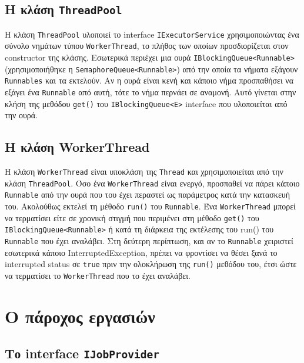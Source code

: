 \documentclass[a4paper,11pt]{article}
\begin{document}
\begin{sloppypar}
\subsection{Η κλάση \texttt{ThreadPool}}

Η κλάση \texttt{ThreadPool} υλοποιεί το interface \texttt{IExecutorService} χρησιμοποιώντας ένα σύνολο νημάτων τύπου \texttt{WorkerThread}, το πλήθος των οποίων προσδιορίζεται στον constructor της κλάσης. Εσωτερικά περιέχει μια ουρά \texttt{IBlockingQueue<Runnable>} (χρησιμοποιήθηκε η \texttt{SemaphoreQueue<Runnable>}) από την οποία τα νήματα εξάγουν \texttt{Runnables} και τα εκτελούν. Αν η ουρά είναι κενή και κάποιο νήμα προσπαθήσει να εξάγει ένα \texttt{Runnable} από αυτή, τότε το νήμα περνάει σε αναμονή. Αυτό γίνεται στην κλήση της μεθόδου \texttt{get()} του \texttt{IBlockingQueue<E>} interface που υλοποιείται από την ουρά.

\subsection{Η κλάση WorkerThread}

Η κλάση \texttt{WorkerThread} είναι υποκλάση της \texttt{Thread} και χρησιμοποιείται από την κλάση \texttt{ThreadPool}. Όσο ένα \texttt{WorkerThread} είναι ενεργό, προσπαθεί να πάρει κάποιο \texttt{Runnable} από την ουρά που του έχει περαστεί ως παράμετρος κατά την κατασκευή του. Ακολούθως εκτελεί τη μέθοδο \texttt{run()} του \texttt{Runnable}. Ένα \texttt{WorkerThread} μπορεί να τερματίσει είτε σε χρονική στιγμή που περιμένει στη μέθοδο \texttt{get()} του \texttt{IBlockingQueue<Runnable>} ή κατά τη διάρκεια της εκτέλεσης του run() του \texttt{Runnable} που έχει αναλάβει. Στη δεύτερη περίπτωση, και αν το \texttt{Runnable} χειριστεί εσωτερικά κάποιο InterruptedException, πρέπει να φροντίσει να θέσει ξανά το interrupted status σε \texttt{true} πριν την ολοκλήρωση της \texttt{run()} μεθόδου του, έτσι ώστε να τερματίσει το \texttt{WorkerThread} που το έχει αναλάβει.

\pagebreak

\section{Ο πάροχος εργασιών}

\subsection{Το interface \texttt{IJobProvider}}


\end{sloppypar}
\end{document}
